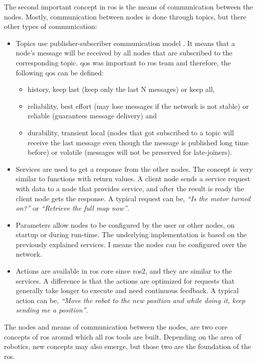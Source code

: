 The second important concept in \ac{ros} is the means of communication between the nodes.
Mostly, communication between nodes is done through topics, but there other types of communication:
\begin{itemize}
    \item Topics use publisher-subscriber communication model \cite{chen_beaconvey_2018}.
    It means that a node's message will be received by all nodes that are subscribed to the corresponding topic. 
    \ac{qos} was important to \ac{ros} team and therefore, the following \ac{qos} can be defined:
    \begin{itemize}
        \item history, keep last (keep only the last N messages) or keep all,
        \item reliability, best effort (may lose messages if the network is not stable) or reliable (guarantees message delivery) and
        \item durability, transient local (nodes that got subscribed to a topic will receive the last message even though the message is published long time before) or volatile (messages will not be preserved for late-joiners).
    \end{itemize}
    \item Services are used to get a response from the other nodes.
    The concept is very similar to functions with return values.
    A client node sends a service request with data to a node that provides service, and after the result is ready the client node gets the response.
    A typical request can be, \textit{``Is the motor turned on?''} or \textit{``Retrieve the full map now''}.
    \item Parameters allow nodes to be configured by the user or other nodes, on startup or during run-time.
    The underlying implementation is based on the previously explained services.
    I means the nodes can be configured over the network.
    \item Actions are available in \ac{ros} core since \ac{ros2}, and they are similar to the services.
    A difference is that the actions are optimized for requests that generally take longer to execute and need continuous feedback. A typical action can be, \textit{``Move the robot to the new position and while doing it, keep sending me a position''}.
\end{itemize}

The nodes and means of communication between the nodes, are two core concepts of \ac{ros} around which all \ac{ros} tools are built.
Depending on the area of robotics, new concepts may also emerge, but those two are the foundation of the \ac{ros}.

